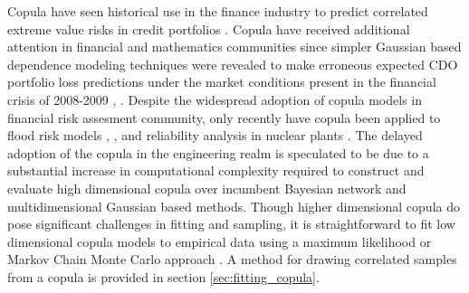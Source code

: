 Copula have seen historical use in the finance industry to
predict correlated extreme value risks in credit portfolios
\cite{Geidosch2016}.  Copula have received additional attention in financial and mathematics communities since 
simpler Gaussian based dependence modeling techniques were revealed to make erroneous expected CDO portfolio loss predictions under the market conditions present in the financial crisis of
2008-2009 \cite{MacKenzie2013}, \cite{Li2000}.  Despite the widespread adoption of copula models in financial risk assesment community, only recently have copula been applied to flood risk
models \cite{Dupuis2007}, \cite{Ganguli2012}, and reliability analysis in nuclear plants
\cite{Kelly2007}.  The delayed adoption of the copula in the
engineering realm is speculated to be due to a substantial increase in computational
complexity required to construct and evaluate high dimensional copula over
incumbent Bayesian network and multidimensional Gaussian based methods.  
Though higher dimensional copula do pose significant challenges in fitting and sampling, it is straightforward to fit low dimensional copula models to empirical data
using a maximum likelihood or Markov Chain Monte Carlo approach \cite{Jouini1996}.
A method for drawing correlated samples from a copula is provided in section \ref{sec:fitting_copula}.
